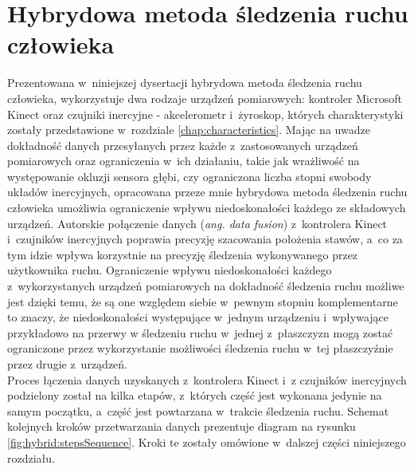 \chapter{Hybrydowa metoda śledzenia ruchu człowieka}\label{chap:hybrid}

Prezentowana w~niniejszej dysertacji hybrydowa metoda śledzenia ruchu człowieka, wykorzystuje dwa rodzaje urządzeń pomiarowych: kontroler Microsoft Kinect oraz czujniki inercyjne - akcelerometr i~żyroskop, których charakterystyki zostały przedstawione w~rozdziale \ref{chap:characteristics}. Mając na uwadze dokładność danych przesyłanych przez każde z~zastosowanych urządzeń pomiarowych oraz ograniczenia w~ich działaniu, takie jak wrażliwość na występowanie okluzji sensora głębi, czy ograniczona liczba stopni swobody układów inercyjnych, opracowana przeze mnie hybrydowa metoda śledzenia ruchu człowieka umożliwia ograniczenie wpływu niedoskonałości każdego ze składowych urządzeń. Autorskie połączenie danych (\emph{ang. data fusion}) z~kontrolera Kinect i~czujników inercyjnych poprawia precyzję szacowania położenia stawów, a~co za tym idzie wpływa korzystnie na precyzję śledzenia wykonywanego przez użytkownika ruchu. Ograniczenie wpływu niedoskonałości każdego z~wykorzystanych urządzeń pomiarowych na dokładność śledzenia ruchu możliwe jest dzięki temu, że są one względem siebie w~pewnym stopniu komplementarne to znaczy, że niedoskonałości występujące w~jednym urządzeniu i~wpływające przykładowo na przerwy w śledzeniu ruchu w~jednej z~płaszczyzn mogą zostać ograniczone przez wykorzystanie możliwości śledzenia ruchu w~tej płaszczyźnie przez drugie z~urządzeń.\\
Proces łączenia danych uzyskanych z~kontrolera Kinect i~z czujników inercyjnych podzielony został na kilka etapów, z~których część jest wykonana jedynie na samym początku, a~część jest powtarzana w~trakcie śledzenia ruchu. Schemat kolejnych kroków przetwarzania danych prezentuje diagram na rysunku \ref{fig:hybrid:stepsSequence}. Kroki te zostały omówione w~dalszej części niniejszego rozdziału.\\

